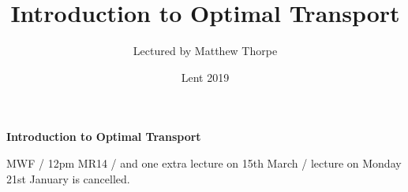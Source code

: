 \documentclass[12pt,a4paper]{article}
\newcommand{\latinmodern}[1]{{\fontfamily{lmss}\selectfont
\textbf{#1}
}}
\DeclarePairedDelimiter\bignorm{\lVert}{\rVert}
\newcommand{\doublerule}[1][.4pt]{%
  \noindent
  \makebox[0pt][l]{\rule[.7ex]{\linewidth}{#1}}%
  \rule[.3ex]{\linewidth}{#1}}
\begin{document}
\title{Introduction to Optimal Transport}
\author{Lectured by Matthew Thorpe}
\date{Lent 2019}

\maketitle

\newcommand{\statement}[1]{\latinmodern{\textbf{#1)}}}

\newcommand{\thm}{\statement{Theorem}}
\newcommand{\thmnum}[1]{\statement{Theorem #1}}
\newcommand{\defi}{\statement{Definition}}
\newcommand{\definum}[1]{\statement{Definition #1}}
\newcommand{\lem}{\statement{Lemma}}
\newcommand{\lemnum}[1]{\statement{Lemma #1}}
\newcommand{\prop}{\statement{Proposition}}
\newcommand{\propnum}[1]{\statement{Proposition #1}}
\newcommand{\corr}{\statement{Corollary}}
\newcommand{\corrnum}[1]{\statement{Corollary #1}}
\newcommand{\pf}{\textbf{proof) }}

\newcommand{\norms}[2]{\bignorm[\big]{#1}_{#2}}
\newcommand{\snorms}[2]{\bignorm[\small]{#1}_{#2}}
\newcommand{\charac}{\bm{1}}
\newcommand{\wa}[1]{ d_{ \mathrel{\scalebox{0.5}[0.5]{$W$}}^{#1}}}

\newcommand{\lap}{\triangle} %
\newcommand{\s}{\vspace{10pt}}
\newcommand{\bull}{$\bullet$}
\newcommand{\sta}{$\star$}
\newcommand{\reals}{\mathbb{R}}

\newcommand{\eop}{\hfill  \textsl{(End of proof)} $\square$} %
\newcommand{\eos}{\hfill  \textsl{(End of statement)} $\square$} %

\newcommand{\call}[1]{\quad \cdots\cdots\cdots\,\,(#1)}

\newcommand{\intN}{\mathbb{Z}_N}
\newcommand{\nat}{\mathbb{N}}
\newcommand{\abs}[1]{\big| #1 \big|}
\newcommand{\avg}{\mathbb{E}}
\newcommand{\prob}{\mathbb{P}}
\newcommand{\borel}{\mathscr{B}}
\newcommand{\EE}{\mathscr{E}}
\newcommand{\pa}{\partial}
\newcommand{\PP}{\mathscr{P}}
\newcommand{\pgi}{\text{P}_{\text{GI}}}

\renewcommand{\vec}{\underline}
\renewcommand{\bar}{\overline}

\def\doubleunderline#1{\underline{\underline{#1}}}

\newcommand{\newday}{\doublerule[0.5pt]}

\setlength\parindent{0pt}

\textbf{Introduction to Optimal Transport}

MWF / 12pm MR14 / and one extra lecture on 15th March / lecture on Monday 21st January is cancelled.
\end{document}
